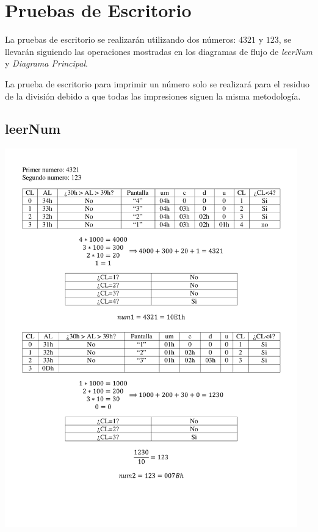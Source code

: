 \documentclass[letter,12 pt,titlepage]{article}
\begin{document}
    
    
    

    \section{Pruebas de Escritorio}

    La pruebas de escritorio se realizarán utilizando dos números: $4321$ y $123$, se llevarán siguiendo las operaciones mostradas en los diagramas de flujo de \textit{leerNum} y \textit{Diagrama Principal}.

    La prueba de escritorio para imprimir un número solo se realizará para el residuo de la división debido a que todas las impresiones siguen la misma metodología.

    \subsection{leerNum}

    \begin{center}
    \includegraphics[width=0.95\textwidth]{img/Primer numero.pdf}
    \end{center}
\end{document}
